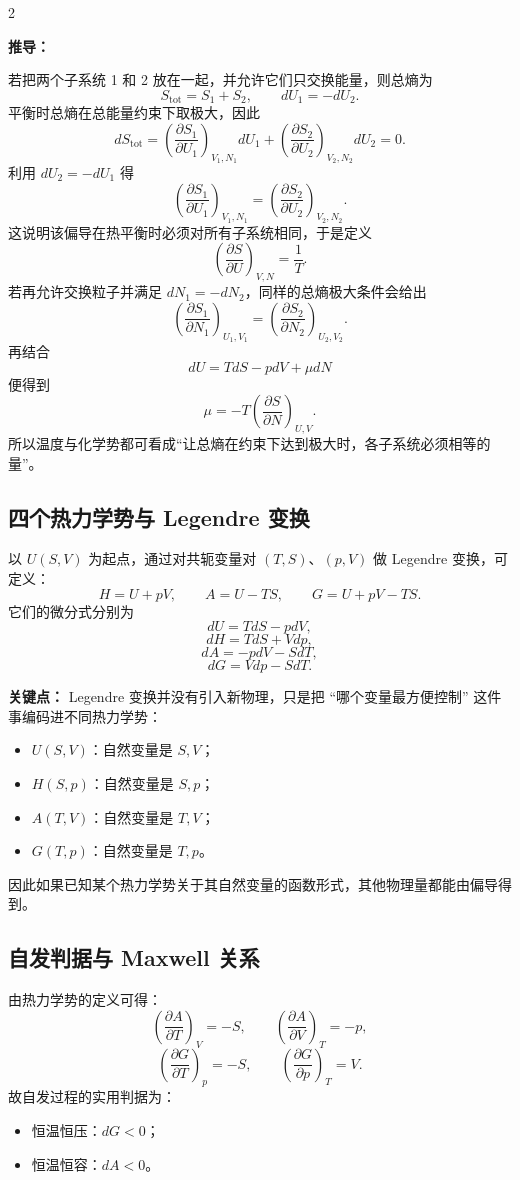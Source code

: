 \documentclass[a4paper,9pt]{article}
\newenvironment{keypoint}
{\par\vspace{0.3em}\noindent\begin{tcolorbox}[
  colback=keybg,
  colframe=keycolor,
  boxrule=0.5pt,
  arc=2pt,
  left=2pt,
  right=2pt,
  top=2pt,
  bottom=2pt,
  boxsep=0pt,
  ]
\noindent\textcolor{keycolor}{\textbf{关键点：}}}
{\end{tcolorbox}\par\vspace{0.3em}}
\newenvironment{derivation}
{\par\vspace{0.3em}\noindent\begin{tcolorbox}[
  colback=boxbg,
  colframe=derivcolor,
  boxrule=0.5pt,
  arc=2pt,
  left=2pt,
  right=2pt,
  top=2pt,
  bottom=2pt,
  boxsep=0pt,
  ]
\scriptsize\noindent\textcolor{derivcolor}{\textbf{推导：}}\par}
{\end{tcolorbox}\par\vspace{0.3em}}
\begin{document}
\begin{multicols}{2}
	\begin{derivation}
		若把两个子系统 1 和 2 放在一起，并允许它们只交换能量，则总熵为
		\[
			S_{\mathrm{tot}}=S_1+S_2,
			\qquad dU_1=-dU_2.
		\]
		平衡时总熵在总能量约束下取极大，因此
		\[
			dS_{\mathrm{tot}}=\left(\frac{\partial S_1}{\partial U_1}\right)_{V_1,N_1}dU_1+
			\left(\frac{\partial S_2}{\partial U_2}\right)_{V_2,N_2}dU_2=0.
		\]
		利用 $dU_2=-dU_1$ 得
		\[
			\left(\frac{\partial S_1}{\partial U_1}\right)_{V_1,N_1}=
			\left(\frac{\partial S_2}{\partial U_2}\right)_{V_2,N_2}.
		\]
		这说明该偏导在热平衡时必须对所有子系统相同，于是定义
		\[
			\left(\frac{\partial S}{\partial U}\right)_{V,N}=\frac{1}{T}.
		\]
		若再允许交换粒子并满足 $dN_1=-dN_2$，同样的总熵极大条件会给出
		\[
			\left(\frac{\partial S_1}{\partial N_1}\right)_{U_1,V_1}=
			\left(\frac{\partial S_2}{\partial N_2}\right)_{U_2,V_2}.
		\]
		再结合
		\[
			dU=TdS-pdV+\mu dN
		\]
		便得到
		\[
			\mu=-T\left(\frac{\partial S}{\partial N}\right)_{U,V}.
		\]
		所以温度与化学势都可看成“让总熵在约束下达到极大时，各子系统必须相等的量”。
	\end{derivation}

	\subsection{四个热力学势与 Legendre 变换}
	以 $U(S,V)$ 为起点，通过对共轭变量对 $(T,S)$、$(p,V)$ 做 Legendre 变换，可定义：
	\[
		H=U+pV,
		\qquad
		A=U-TS,
		\qquad
		G=U+pV-TS.
	\]
	它们的微分式分别为
	\[
		dU=TdS-pdV,
	\]
	\[
		dH=TdS+Vdp,
	\]
	\[
		dA=-pdV-SdT,
	\]
	\[
		dG=Vdp-SdT.
	\]

	\begin{keypoint}
		Legendre 变换并没有引入新物理，只是把 ``哪个变量最方便控制'' 这件事编码进不同热力学势：
		\begin{itemize}
			\item $U(S,V)$：自然变量是 $S,V$；
			\item $H(S,p)$：自然变量是 $S,p$；
			\item $A(T,V)$：自然变量是 $T,V$；
			\item $G(T,p)$：自然变量是 $T,p$。
		\end{itemize}
		因此如果已知某个热力学势关于其自然变量的函数形式，其他物理量都能由偏导得到。
	\end{keypoint}

	\subsection{自发判据与 Maxwell 关系}
	由热力学势的定义可得：
	\[
		\left(\frac{\partial A}{\partial T}\right)_V=-S,
		\qquad
		\left(\frac{\partial A}{\partial V}\right)_T=-p,
	\]
	\[
		\left(\frac{\partial G}{\partial T}\right)_p=-S,
		\qquad
		\left(\frac{\partial G}{\partial p}\right)_T=V.
	\]
	故自发过程的实用判据为：
	\begin{itemize}
		\item 恒温恒压：$dG<0$；
		\item 恒温恒容：$dA<0$。
	\end{itemize}


\end{multicols}
\end{document}
